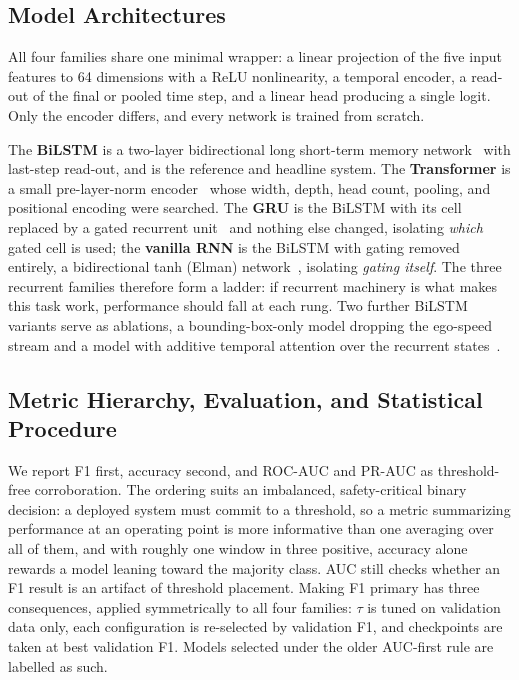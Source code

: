 \documentclass[mti,article,submit,moreauthors]{Definitions/mdpi}
\begin{document}
\subsection{Model Architectures}
\label{sec:architectures}

All four families share one minimal wrapper: a linear projection of the five input features to 64 dimensions with a ReLU nonlinearity, a temporal encoder, a read-out of the final or pooled time step, and a linear head producing a single logit. Only the encoder differs, and every network is trained from scratch.

The \textbf{BiLSTM} is a two-layer bidirectional long short-term memory network~\citep{hochreiter1997lstm} with last-step read-out, and is the reference and headline system. The \textbf{Transformer} is a small pre-layer-norm encoder~\citep{vaswani2017attention} whose width, depth, head count, pooling, and positional encoding were searched. The \textbf{GRU} is the BiLSTM with its cell replaced by a gated recurrent unit~\citep{cho2014gru} and nothing else changed, isolating \emph{which} gated cell is used; the \textbf{vanilla RNN} is the BiLSTM with gating removed entirely, a bidirectional tanh (Elman) network~\citep{elman1990rnn}, isolating \emph{gating itself}. The three recurrent families therefore form a ladder: if recurrent machinery is what makes this task work, performance should fall at each rung. Two further BiLSTM variants serve as ablations, a bounding-box-only model dropping the ego-speed stream and a model with additive temporal attention over the recurrent states~\citep{bahdanau2015attention}.

\subsection{Metric Hierarchy, Evaluation, and Statistical Procedure}
\label{sec:metrics}

We report F1 first, accuracy second, and ROC-AUC and PR-AUC as threshold-free corroboration. The ordering suits an imbalanced, safety-critical binary decision: a deployed system must commit to a threshold, so a metric summarizing performance at an operating point is more informative than one averaging over all of them, and with roughly one window in three positive, accuracy alone rewards a model leaning toward the majority class. AUC still checks whether an F1 result is an artifact of threshold placement. Making F1 primary has three consequences, applied symmetrically to all four families: $\tau$ is tuned on validation data only, each configuration is re-selected by validation F1, and checkpoints are taken at best validation F1. Models selected under the older AUC-first rule are labelled as such.
\end{document}
